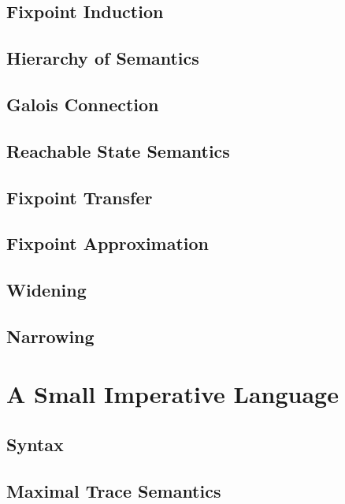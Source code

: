 \subsection{Fixpoint Induction}

\subsection{Hierarchy of Semantics}

\subsection{Galois Connection}

\subsection{Reachable State Semantics}

\subsection{Fixpoint Transfer}

\subsection{Fixpoint Approximation}

\subsection{Widening}

\subsection{Narrowing}


\section{A Small Imperative Language}

\subsection{Syntax}

\subsection{Maximal Trace Semantics}

